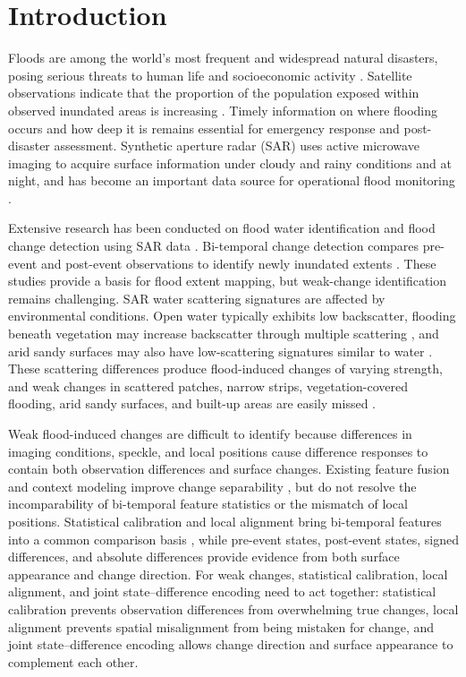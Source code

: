 \documentclass[authoryear,preprint,12pt]{elsarticle}
\begin{document}
\section{Introduction}

Floods are among the world's most frequent and widespread natural disasters, posing serious threats to human life and socioeconomic activity \citep{credUndrr2020disasters}. Satellite observations indicate that the proportion of the population exposed within observed inundated areas is increasing \citep{tellman2021exposure}. Timely information on where flooding occurs and how deep it is remains essential for emergency response and post-disaster assessment. Synthetic aperture radar (SAR) uses active microwave imaging to acquire surface information under cloudy and rainy conditions and at night, and has become an important data source for operational flood monitoring \citep{wagner2026gfm}.

Extensive research has been conducted on flood water identification and flood change detection using SAR data \citep{jiang2021rapid,lee2026smagnet}. Bi-temporal change detection compares pre-event and post-event observations to identify newly inundated extents \citep{giustarini2013urbanFloodCd}. These studies provide a basis for flood extent mapping, but weak-change identification remains challenging. SAR water scattering signatures are affected by environmental conditions. Open water typically exhibits low backscatter, flooding beneath vegetation may increase backscatter through multiple scattering \citep{tsyganskaya2018vegetation}, and arid sandy surfaces may also have low-scattering signatures similar to water \citep{garg2024aridFlood}. These scattering differences produce flood-induced changes of varying strength, and weak changes in scattered patches, narrow strips, vegetation-covered flooding, arid sandy surfaces, and built-up areas are easily missed \citep{amitrano2024sarFloodReview}.

Weak flood-induced changes are difficult to identify because differences in imaging conditions, speckle, and local positions cause difference responses to contain both observation differences and surface changes. Existing feature fusion and context modeling improve change separability \citep{saleh2024dam,du2026high}, but do not resolve the incomparability of bi-temporal feature statistics or the mismatch of local positions. Statistical calibration and local alignment bring bi-temporal features into a common comparison basis \citep{zhu2021deformable}, while pre-event states, post-event states, signed differences, and absolute differences provide evidence from both surface appearance and change direction. For weak changes, statistical calibration, local alignment, and joint state--difference encoding need to act together: statistical calibration prevents observation differences from overwhelming true changes, local alignment prevents spatial misalignment from being mistaken for change, and joint state--difference encoding allows change direction and surface appearance to complement each other.
\end{document}
